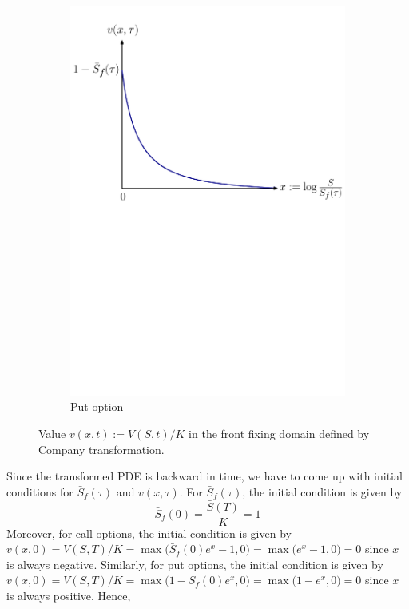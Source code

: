 \begin{figure}[H]
\begin{subfigure}{0.305\textheight}
    \includegraphics[width=\textwidth]{chapters/chapter2/CompanyPutOption.pdf}
    \caption{Put option}
    \label{fig:blackscholes:frontfixingmethod:company_put_value_vs_curve}
  \end{subfigure}
  \caption{Value $v(x,t) := V(S,t) / K$ in the front fixing domain defined by Company transformation.}
  \label{fig:blackscholes:frontfixingmethod:company_value_vs_curve}
\end{figure}
Since the transformed PDE is backward in time, we have to come up with initial conditions for $\bar{S}_f(\tau)$ and $v(x, \tau)$. For $\bar{S}_f(\tau)$, the initial condition is given by
\begin{equation}
  \bar{S}_f(0) = \dfrac{\bar{S}(T)}{K} = 1
\end{equation}
Moreover, for call options, the initial condition is given by $v(x, 0) = V(S, T) / K = \max\big(\bar{S}_f(0)e^{x} - 1, 0\big) = \max\big(e^{x} - 1, 0\big) = 0$ since $x$ is always negative. Similarly, for put options, the initial condition is given by $v(x, 0) = V(S, T) / K = \max\big(1 - \bar{S}_f(0)e^x, 0\big) = \max\big(1 - e^x, 0\big) = 0$ since $x$ is always positive. Hence,
